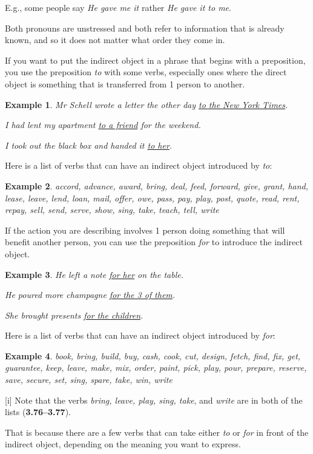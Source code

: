 \documentclass[oneside]{book}
\numberwithin{equation}{section}
\newtheorem{example}{Example}[section]
\begin{document}
E.g., some people say \textit{He gave me it} rather \textit{He gave it to me}.

Both pronouns are unstressed and both refer to information that is already known, and so it does not matter what order they come in.

%
If you want to put the indirect object in a phrase that begins with a preposition, you use the preposition \textit{to} with some verbs, especially ones where the direct object is something that is transferred from 1 person to another.
\begin{example}
    Mr Schell wrote a letter the other day \underline{to the New York Times}.
    
    I had lent my apartment \underline{to a friend} for the weekend.
    
    I took out the black box and handed it \underline{to her}.
\end{example}
Here is a list of verbs that can have an indirect object introduced by \textit{to}:
\begin{example}
    accord, advance, award, bring, deal, feed, forward, give, grant, hand, lease, leave, lend, loan, mail, offer, owe, pass, pay, play, post, quote, read, rent, repay, sell, send, serve, show, sing, take, teach, tell, write
\end{example}
%
\noindent{} If the action you are describing involves 1 person doing something that will benefit another person, you can use the preposition \textit{for} to introduce the indirect object.
\begin{example}
    He left a note \underline{for her} on the table.
    
    He poured more champagne \underline{for the 3 of them}.
    
    She brought presents \underline{for the children}.
\end{example}
Here is a list of verbs that can have an indirect object introduced by \textit{for}:
\begin{example}
    book, bring, build, buy, cash, cook, cut, design, fetch, find, fix, get, guarantee, keep, leave, make, mix, order, paint, pick, play, pour, prepare, reserve, save, secure, set, sing, spare, take, win, write
\end{example}
%
\noindent{} [i] Note that the verbs \textit{bring, leave, play, sing, take}, and \textit{write} are in both of the lists (\textbf{3.76--3.77}).

That is because there are a few verbs that can take either \textit{to} or \textit{for} in front of the indirect object, depending on the meaning you want to express.
\end{document}
